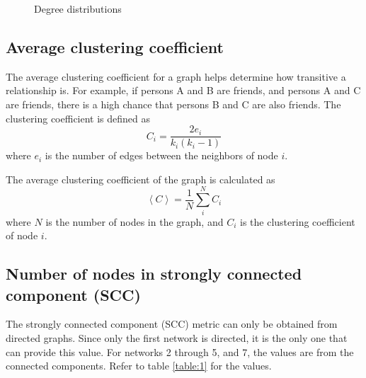 \begin{figure}
    \qquad
    \qquad
    \caption{Degree distributions}
    \label{fig:4}
\end{figure}

\subsection{Average clustering coefficient}
The average clustering coefficient for a graph helps determine how transitive a relationship is. For example, if persons A and B are friends, and persons A and C are friends, there is a high chance that persons B and C are also friends. The clustering coefficient is defined as
\begin{equation}
    C_i = \frac{2e_i}{k_i(k_i-1)}
    \label{equation:clustering_coef}
\end{equation}
where $e_i$ is the number of edges between the neighbors of node $i$.

The average clustering coefficient of the graph is calculated as
\begin{equation}
    \left\langle C \right\rangle = \frac{1}{N}\sum_{i}^{N}C_i
    \label{equation:avg_clustering_coef}
\end{equation}
where $N$ is the number of nodes in the graph, and $C_i$ is the clustering coefficient of node $i$.

\subsection{Number of nodes in strongly connected component (SCC)}
The strongly connected component (SCC) metric can only be obtained from directed graphs. Since only the first network is directed, it is the only one that can provide this value. For networks 2 through 5, and 7, the values are from the connected components. Refer to table \ref{table:1} for the values.

